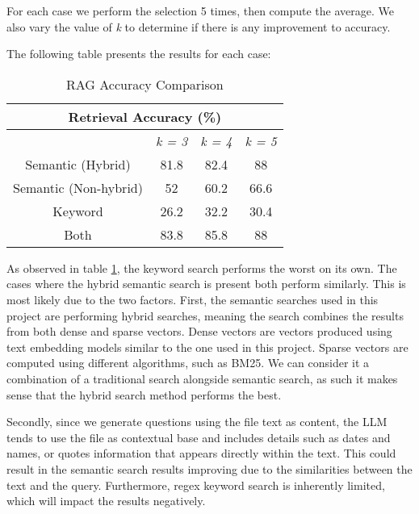 For each case we perform the selection 5 times, then compute the average. We also vary the value of \textit{k} to determine if there is any improvement to accuracy.

The following table presents the results for each case:

\begin{table}
	\centering
	\begin{tabular}{|c|c|c|c|}
		\hline
		\multicolumn{4}{|c|}{Retrieval Accuracy (\%)}                            \\
		\hline
		                      & \textit{k = 3} & \textit{k = 4} & \textit{k = 5} \\
		\hline
		Semantic (Hybrid)     & 81.8           & 82.4           & 88             \\
		\hline
		Semantic (Non-hybrid) & 52             & 60.2           & 66.6           \\
		\hline
		Keyword               & 26.2           & 32.2           & 30.4           \\
		\hline
		Both                  & 83.8           & 85.8           & 88             \\
		\hline
	\end{tabular}
	\caption{RAG Accuracy Comparison}
	\label{Tab:RAGAccuracyComp}
\end{table}


As observed in table \ref{Tab:RAGAccuracyComp}, the keyword search performs the worst on its own. The cases where the hybrid semantic search is present both perform similarly. This is most likely due to the two factors. First, the semantic searches used in this project are performing hybrid searches, meaning the search combines the results from both dense and sparse vectors. Dense vectors are vectors produced using text embedding models similar to the one used in this project. Sparse vectors are computed using different algorithms, such as BM25. We can consider it a combination of a traditional search alongside semantic search, as such it makes sense that the hybrid search method performs the best.

Secondly, since we generate questions using the file text as content, the LLM tends to use the file as contextual base and includes details such as dates and names, or quotes information that appears directly within the text. This could result in the semantic search results improving due to the similarities between the text and the query. Furthermore, regex keyword search is inherently limited, which will impact the results negatively.

